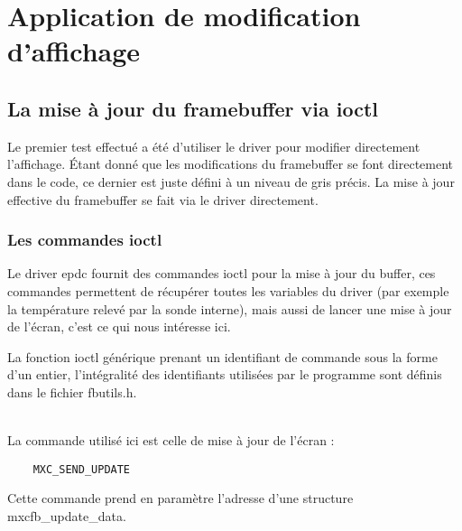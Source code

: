%

\newpage

\section{Application de modification d'affichage} %


\subsection{La mise à jour du framebuffer via ioctl}

Le premier test effectué a été d'utiliser le driver pour modifier directement l'affichage.
Étant donné que les modifications du framebuffer se font directement dans le code, ce dernier est juste défini à un niveau de gris précis. La mise à jour effective du framebuffer se fait via le driver directement.

\subsubsection{Les commandes ioctl}

Le driver epdc fournit des commandes ioctl pour la mise à jour du buffer, ces commandes permettent de récupérer toutes les variables du driver (par exemple la température relevé par la sonde interne), mais aussi de lancer une mise à jour de l'écran, c'est ce qui nous intéresse ici.

La fonction ioctl générique prenant un identifiant de commande sous la forme d'un entier, l'intégralité des identifiants utilisées par le programme sont définis dans le fichier fbutils.h. %

~\\
La commande utilisé ici est celle de mise à jour de l'écran : 
\begin{lstlisting}
	MXC_SEND_UPDATE
\end{lstlisting}
Cette commande prend en paramètre l'adresse d'une structure mxcfb_update_data.

